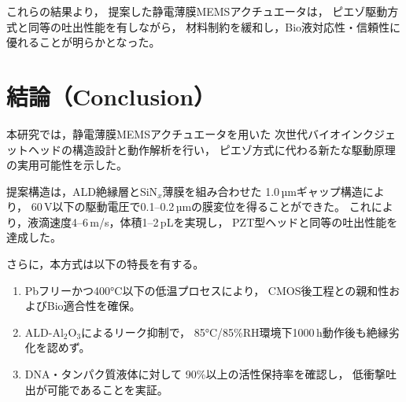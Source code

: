 \documentclass[conference]{IEEEtran}
\begin{document}
\begin{table}[t]
\centering
\caption{主要評価結果（Experimental / Simulation Results）}
\label{tab:result}
\end{table}

これらの結果より，
提案した静電薄膜MEMSアクチュエータは，
ピエゾ駆動方式と同等の吐出性能を有しながら，
材料制約を緩和し，Bio液対応性・信頼性に優れることが明らかとなった。

\section{結論（Conclusion）}
本研究では，静電薄膜MEMSアクチュエータを用いた
次世代バイオインクジェットヘッドの構造設計と動作解析を行い，
ピエゾ方式に代わる新たな駆動原理の実用可能性を示した。

提案構造は，ALD絶縁層とSiN$_x$薄膜を組み合わせた
1.0\,µmギャップ構造により，
60\,V以下の駆動電圧で0.1--0.2\,µmの膜変位を得ることができた。
これにより，液滴速度4--6\,m/s，体積1--2\,pLを実現し，
PZT型ヘッドと同等の吐出性能を達成した。

さらに，本方式は以下の特長を有する。
\begin{enumerate}
  \item Pbフリーかつ400°C以下の低温プロセスにより，
        CMOS後工程との親和性およびBio適合性を確保。
  \item ALD-Al$_2$O$_3$によるリーク抑制で，
        85°C/85\%RH環境下1000\,h動作後も絶縁劣化を認めず。
  \item DNA・タンパク質液体に対して
        90\%以上の活性保持率を確認し，
        低衝撃吐出が可能であることを実証。
\end{enumerate}
\end{document}
